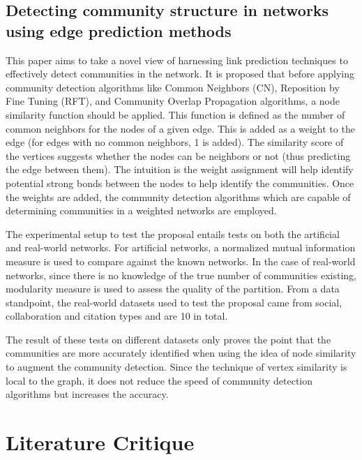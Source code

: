 \documentclass[11pt]{article}
\begin{document}
\subsection{Detecting community structure in networks using edge prediction methods \cite{yangregory}}
This paper aims to take a novel view of harnessing link prediction techniques to effectively detect communities in the network. It is proposed that before applying community detection algorithms like Common Neighbors (CN), Reposition by Fine Tuning (RFT), and Community Overlap Propagation algorithms, a node similarity function should be applied. This function is defined as the number of common neighbors for the nodes of a given edge. This is added as a weight to the edge (for edges with no common neighbors, 1 is added). The similarity score of the vertices suggests whether the nodes can be neighbors or not (thus predicting the edge between them). The intuition is the weight assignment will help identify potential strong bonds between the nodes to help identify the communities. Once the weights are added, the community detection algorithms which are capable of determining communities in a weighted networks are employed.\\
\par
The experimental setup to test the proposal entails tests on both the artificial and real-world networks. For artificial networks, a normalized mutual information measure is used to compare against the known networks. In the case of real-world networks, since there is no knowledge of the true number of communities existing, modularity measure is used to assess the quality of the partition. From a data standpoint, the real-world datasets used to test the proposal came from social, collaboration and citation types and are 10 in total.\\
\par
The result of these tests on different datasets only proves the point that the communities are more accurately identified when using the idea of node similarity to augment the community detection. Since the technique of vertex similarity is local to the graph, it does not reduce the speed of community detection algorithms but increases the accuracy.



\section{Literature Critique}
\end{document}
